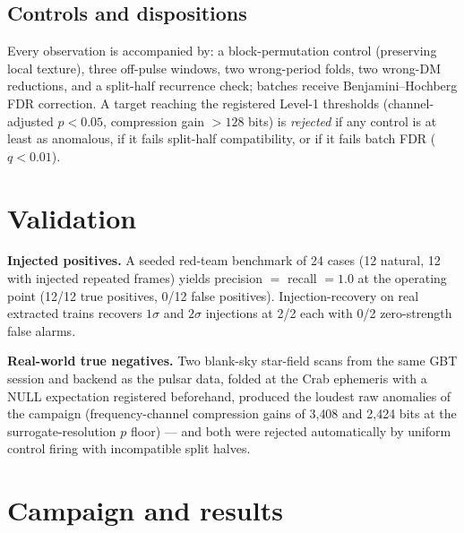 \documentclass[11pt]{article}
\begin{document}
\subsection{Controls and dispositions}
Every observation is accompanied by: a block-permutation control (preserving
local texture), three off-pulse windows, two wrong-period folds, two wrong-DM
reductions, and a split-half recurrence check; batches receive
Benjamini--Hochberg FDR correction. A target reaching the registered Level-1
thresholds (channel-adjusted $p<0.05$, compression gain $>128$ bits) is
\emph{rejected} if any control is at least as anomalous, if it fails split-half
compatibility, or if it fails batch FDR ($q<0.01$).

\section{Validation}

\textbf{Injected positives.} A seeded red-team benchmark of 24 cases (12
natural, 12 with injected repeated frames) yields precision $=$ recall $=1.0$
at the operating point (12/12 true positives, 0/12 false positives).
Injection-recovery on real extracted trains recovers $1\sigma$ and $2\sigma$
injections at 2/2 each with 0/2 zero-strength false alarms.

\textbf{Real-world true negatives.} Two blank-sky star-field scans from the
same GBT session and backend as the pulsar data, folded at the Crab ephemeris
with a NULL expectation registered beforehand, produced the loudest raw
anomalies of the campaign (frequency-channel compression gains of 3{,}408 and
2{,}424 bits at the surrogate-resolution $p$ floor) --- and both were rejected
automatically by uniform control firing with incompatible split halves.

\section{Campaign and results}
\end{document}
